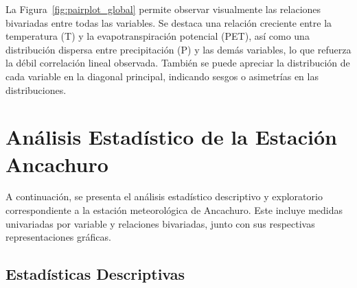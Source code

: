 La Figura~\ref{fig:pairplot_global} permite observar visualmente las relaciones bivariadas entre todas las variables. Se destaca una relación creciente entre la temperatura (T) y la evapotranspiración potencial (PET), así como una distribución dispersa entre precipitación (P) y las demás variables, lo que refuerza la débil correlación lineal observada. También se puede apreciar la distribución de cada variable en la diagonal principal, indicando sesgos o asimetrías en las distribuciones.





\section{Análisis Estadístico de la Estación Ancachuro}

A continuación, se presenta el análisis estadístico descriptivo y exploratorio correspondiente a la estación meteorológica de Ancachuro. Este incluye medidas univariadas por variable y relaciones bivariadas, junto con sus respectivas representaciones gráficas.

\subsection{Estadísticas Descriptivas}

